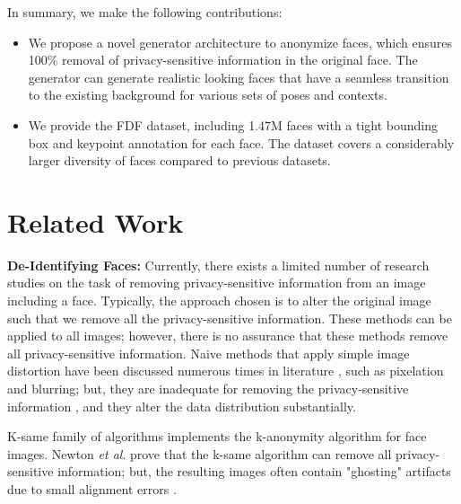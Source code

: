 \documentclass[runningheads]{llncs}
\newcommand{\etal}{\textit{et al}. }
\begin{document}
In summary, we make the following contributions:
\begin{itemize}

    \item We propose a novel generator architecture to anonymize faces, which ensures 100\% removal of privacy-sensitive information in the original face. The generator can generate realistic looking faces that have a seamless transition to the existing background for various sets of poses and contexts.
    \item We provide the FDF dataset, including 1.47M faces with a tight bounding box and keypoint annotation for each face. The dataset covers a considerably larger diversity of faces compared to previous datasets.
    


\end{itemize}

 \section{Related Work}


\textbf{De-Identifying Faces:}
Currently, there exists a limited number of  research studies on the task of removing privacy-sensitive information from an image including a face. 
Typically, the approach chosen is to alter the original image such that we remove all the privacy-sensitive information. 
These methods can be applied to all images; however, there is no assurance that these methods remove all privacy-sensitive information. 
Naive methods that apply simple image distortion have been discussed numerous times in literature \cite{Boyle2000ThePrivacy,Neustaedter2006BlurConferencing,Gross2009FaceDe-identification,Newton2005,Gross2006Model-basedDe-identification}, such as pixelation and blurring; but, they are inadequate for removing the privacy-sensitive information \cite{Gross2006Model-basedDe-identification,Neustaedter2006BlurConferencing,Newton2005}, and they alter the data distribution substantially.

K-same family of algorithms \cite{Gross2006Model-basedDe-identification,Jourabloo2015AttributeDe-identification,Newton2005} implements the k-anonymity algorithm \cite{Sweeney2002K-anonymity:Privacy} for face images. Newton \etal prove that the k-same algorithm can remove all privacy-sensitive information; but, the resulting images often contain "ghosting" artifacts due to small alignment errors \cite{Gross2006Model-basedDe-identification}.
\end{document}
